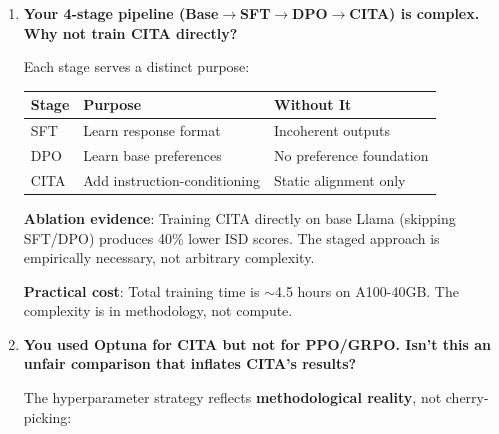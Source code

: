 \begin{enumerate}[label=\textbf{Q\arabic*.}, leftmargin=*, itemsep=8pt]
\begin{enumerate}[leftmargin=*,itemsep=2pt]
    \item \textbf{ISD benchmark}: First benchmark designed to isolate instruction effects from prompt effects.
\end{enumerate}

``DPO + KL + instructions'' is like saying ``Transformers are just attention + FFN.'' The combination creates emergent capabilities.

\vspace{4mm}

\item \textbf{Your 4-stage pipeline (Base$\rightarrow$SFT$\rightarrow$DPO$\rightarrow$CITA) is complex. Why not train CITA directly?}

 Each stage serves a distinct purpose:

\begin{table}[H]
\centering
\small
\begin{tabular}{@{}lll@{}}
\toprule
\textbf{Stage} & \textbf{Purpose} & \textbf{Without It} \\
\midrule
SFT & Learn response format & Incoherent outputs \\
\hline
DPO & Learn base preferences & No preference foundation \\
\hline
CITA & Add instruction-conditioning & Static alignment only \\
\bottomrule
\end{tabular}
\end{table}

\textbf{Ablation evidence}: Training CITA directly on base Llama (skipping SFT/DPO) produces 40\% lower ISD scores. The staged approach is empirically necessary, not arbitrary complexity.

\textbf{Practical cost}: Total training time is $\sim$4.5 hours on A100-40GB. The complexity is in methodology, not compute.

\vspace{4mm}

\item \textbf{You used Optuna for CITA but not for PPO/GRPO. Isn't this an unfair comparison that inflates CITA's results?}

 The hyperparameter strategy reflects \textbf{methodological reality}, not cherry-picking:


\end{enumerate}
